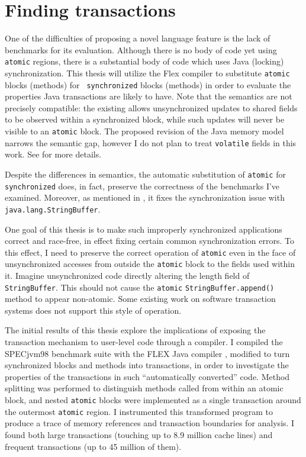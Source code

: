 \section{Finding transactions}\label{sec:auto}
One of the difficulties of proposing a novel language feature is the
lack of benchmarks for its evaluation.  Although there is no body of
code yet using {\tt atomic} regions, there is a substantial body of
code which uses Java (locking) synchronization.  This thesis will
utilize the Flex compiler to
substitute {\tt atomic} blocks (methods) for {\tt
  synchronized} blocks (methods) in order to evaluate the properties
Java transactions are likely to have.  Note that the semantics are not
precisely compatible: the existing  allows
unsynchronized updates to shared fields to be observed within a
synchronized block, while such updates will never be visible to an
{\tt atomic} block.  The proposed revision of the Java memory model
\cite{MansonPu02} narrows the semantic gap, however I do not
plan to treat {\tt volatile} fields in this work.  See
 for more details.

Despite the differences in semantics, the automatic substitution of
{\tt atomic} for {\tt synchronized} does, in fact, preserve the
correctness of the benchmarks I've examined.  Moreover, as
mentioned in , it
fixes the synchronization issue with {\tt java.lang.StringBuffer}.

One goal of this thesis is to make such improperly synchronized
applications correct and race-free, in effect fixing certain common
synchronization errors.  To this effect, I need to preserve the
correct operation of {\tt atomic} even in the face of unsynchronized
accesses from outside the {\tt atomic} block to the fields used within
it.  Imagine unsynchronized code directly altering the length field of
{\tt StringBuffer}.  This should not cause the {\tt atomic}
{\tt StringBuffer.append()} method to appear non-atomic.
Some existing work on software transaction systems \cite{HarrisFr03}
does not support this style of operation.

\label{sec:properties}
The initial results of this thesis
explore the implications of exposing the transaction
mechanism to user-level code through a compiler.
I compiled the SPECjvm98 benchmark suite with the FLEX Java compiler
\cite{Flex},
modified to turn synchronized blocks and methods into transactions,
in order to investigate the properties of the transactions in such
``automatically converted'' code.
Method splitting was performed to distinguish methods called from
within an atomic block, and nested
\texttt{atomic} blocks were implemented as a single
transaction around the outermost \texttt{atomic} region.  I
instrumented this transformed program to produce a trace of
memory references and transaction boundaries for analysis.
I found both large
transactions (touching up to 8.9 million cache lines) and frequent
transactions (up to 45 million of them).

